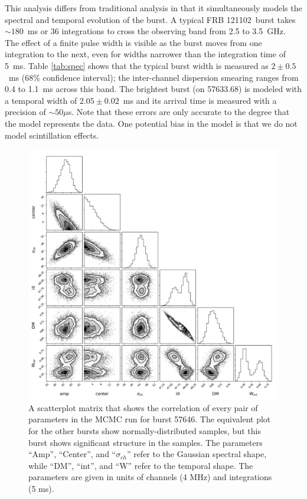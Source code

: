 \documentclass[twocolumn]{aastex61}
\newcommand{\frb}{FRB 121102}
\begin{document}
This analysis differs from traditional analysis in that it simultaneously models the spectral and temporal evolution of the burst. A typical \frb\ burst takes $\sim180$~ms or 36 integrations to cross the observing band from 2.5 to 3.5~GHz. The effect of a finite pulse width is visible as the burst moves from one integration to the next, even for widths narrower than the integration time of 5~ms. Table \ref{tab:spec} shows that the typical burst width is measured as $2\pm0.5$~ms (68\% confidence interval); the inter-channel dispersion smearing ranges from 0.4 to 1.1~ms across this band. The brightest burst (on 57633.68) is modeled with a temporal width of $2.05\pm0.02$~ms and its arrival time is measured with a precision of $\sim50\mu$s. Note that these errors are only accurate to the degree that the model represents the data. One potential bias in the model is that we do not model scintillation effects.


\begin{figure}[htb]
\begin{center}
\includegraphics[width=2\columnwidth]{corner57646}
\caption{A scatterplot matrix that shows the correlation of every pair of parameters in the MCMC run for burst 57646. The equivalent plot for the other bursts show normally-distributed samples, but this burst shows significant structure in the samples. The parameters ``Amp'', ``Center'', and ``$\sigma_{ch}$'' refer to the Gaussian spectral shape, while ``DM'', ``int'', and ``W'' refer to the temporal shape. The parameters are given in units of channels (4 MHz) and integrations (5 ms).
\label{fig:corner}}
\end{center}
\end{figure}
\end{document}
